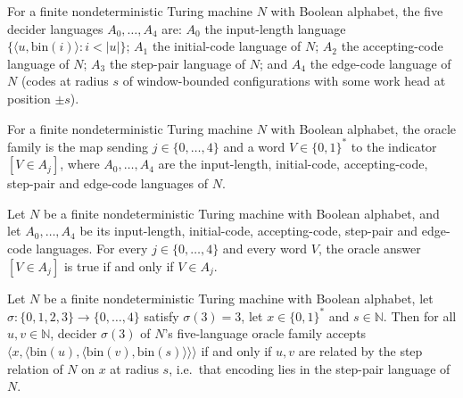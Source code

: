 \begin{definition}
\label{Complexity.LogProg.SavitchARM.dpAs}
\leanok
{}
For a finite nondeterministic Turing machine $N$ with Boolean alphabet, the five decider languages
$A_0,\dots,A_4$ are: $A_0$ the input-length language
$\{\langle u,\mathrm{bin}(i)\rangle : i<|u|\}$; $A_1$ the initial-code language of $N$; $A_2$ the
accepting-code language of $N$; $A_3$ the step-pair language of $N$; and $A_4$ the edge-code
language of $N$ (codes at radius $s$ of window-bounded configurations with some work head at
position $\pm s$).
\end{definition}

\begin{definition}
\label{Complexity.LogProg.SavitchARM.dpOrc}
\leanok
{}
For a finite nondeterministic Turing machine $N$ with Boolean alphabet, the oracle family is the
map sending $j\in\{0,\dots,4\}$ and a word $V\in\{0,1\}^*$ to the indicator $[V\in A_j]$, where
$A_0,\dots,A_4$ are the input-length, initial-code, accepting-code, step-pair and edge-code
languages of $N$.
\end{definition}

\begin{theorem}
\label{Complexity.LogProg.SavitchARM.dp_mem}
\leanok
{}
Let $N$ be a finite nondeterministic Turing machine with Boolean alphabet, and let
$A_0,\dots,A_4$ be its input-length, initial-code, accepting-code, step-pair and edge-code
languages. For every $j\in\{0,\dots,4\}$ and every word $V$, the oracle answer $[V\in A_j]$ is true
if and only if $V\in A_j$.
\end{theorem}

\begin{theorem}
\label{Complexity.LogProg.SavitchARM.dp_rel}
\leanok
{}
Let $N$ be a finite nondeterministic Turing machine with Boolean alphabet, let
$\sigma:\{0,1,2,3\}\to\{0,\dots,4\}$ satisfy $\sigma(3)=3$, let $x\in\{0,1\}^*$ and $s\in\mathbb{N}$.
Then for all $u,v\in\mathbb{N}$, decider $\sigma(3)$ of $N$'s five-language oracle family accepts
$\langle x,\langle\mathrm{bin}(u),\langle\mathrm{bin}(v),\mathrm{bin}(s)\rangle\rangle\rangle$ if and
only if $u,v$ are related by the step relation of $N$ on $x$ at radius $s$, i.e.\ that encoding lies
in the step-pair language of $N$.
\end{theorem}

